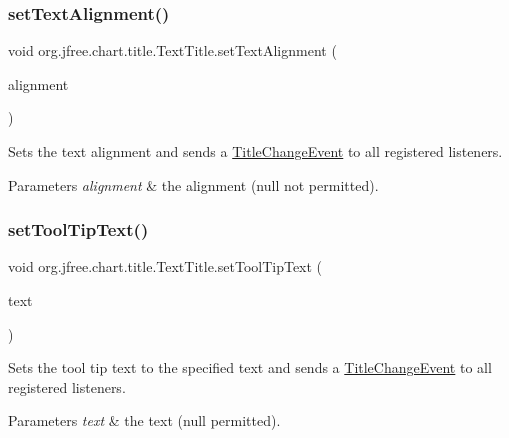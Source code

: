 \subsubsection{\texorpdfstring{set\+Text\+Alignment()}{setTextAlignment()}}
{\footnotesize\ttfamily void org.\+jfree.\+chart.\+title.\+Text\+Title.\+set\+Text\+Alignment (\begin{DoxyParamCaption}\item[{Horizontal\+Alignment}]{alignment }\end{DoxyParamCaption})}

Sets the text alignment and sends a \mbox{\hyperlink{}{Title\+Change\+Event}} to all registered listeners.


\begin{DoxyParams}{Parameters}
{\em alignment} & the alignment ({\ttfamily null} not permitted). \\
\hline
\end{DoxyParams}
\mbox{\label{classorg_1_1jfree_1_1chart_1_1title_1_1_text_title_a0f7f3f30fe0bc99b5cf07770d91dfe00}} 
\subsubsection{\texorpdfstring{set\+Tool\+Tip\+Text()}{setToolTipText()}}
{\footnotesize\ttfamily void org.\+jfree.\+chart.\+title.\+Text\+Title.\+set\+Tool\+Tip\+Text (\begin{DoxyParamCaption}\item[{String}]{text }\end{DoxyParamCaption})}

Sets the tool tip text to the specified text and sends a \mbox{\hyperlink{}{Title\+Change\+Event}} to all registered listeners.


\begin{DoxyParams}{Parameters}
{\em text} & the text ({\ttfamily null} permitted). \\
\hline
\end{DoxyParams}
\mbox{\label{classorg_1_1jfree_1_1chart_1_1title_1_1_text_title_a8791ab5c8c4ad694bc0a5ee2ba0334a8}} 

